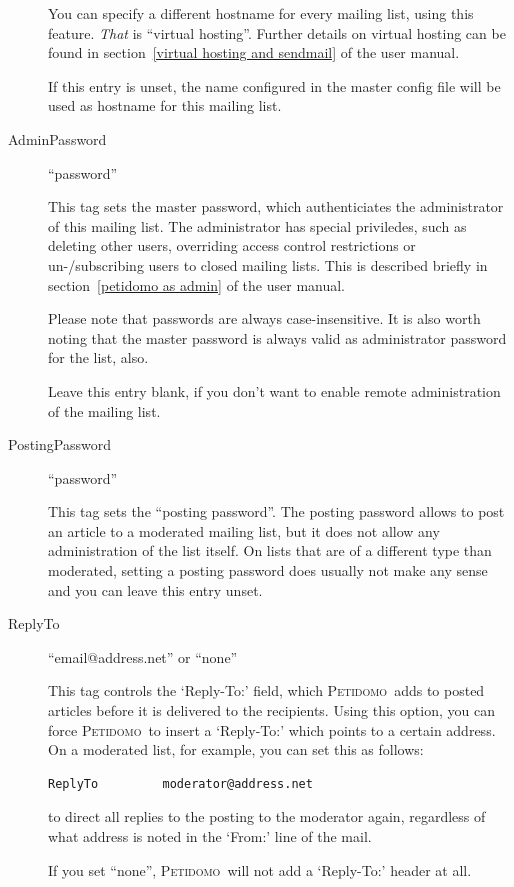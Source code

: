 \documentclass[a4paper,10pt]{scrreprt}
\newcommand{\Petidomo}{{\scshape Peti\-domo}}
\begin{document}
\begin{description}
You can specify a different hostname for every mailing list, using
this feature. \emph{That} is ``virtual hosting''. Further details on
virtual hosting can be found in section~\ref{virtual hosting and
sendmail} of the user manual.

If this entry is unset, the name configured in the master config file
will be used as hostname for this mailing list.

\item[AdminPassword] \hfill ``password''
\label{list admin password}

This tag sets the master password, which authenticiates the
administrator of this mailing list. The administrator has special
priviledes, such as deleting other users, overriding access control
restrictions or un-/subscribing users to closed mailing lists. This is
described briefly in section~\ref{petidomo as admin} of the user manual.

Please note that passwords are always case-insensitive. It is also
worth noting that the master password is always valid as administrator
password for the list, also.

Leave this entry blank, if you don't want to enable remote
administration of the mailing list.

\item[PostingPassword] \hfill ``password''
\label{posting password}

This tag sets the ``posting password''. The posting password allows to
post an article to a moderated mailing list, but it does not allow any
administration of the list itself. On lists that are of a different
type than moderated, setting a posting password does usually not make
any sense and you can leave this entry unset.

\item[ReplyTo] \hfill ``email@address.net'' or ``none''

This tag controls the `Reply-To:' field, which \Petidomo\ adds to
posted articles before it is delivered to the recipients. Using this
option, you can force \Petidomo\ to insert a `Reply-To:' which points
to a certain address. On a moderated list, for example, you can set
this as follows:
\begin{verbatim}
ReplyTo         moderator@address.net
\end{verbatim}
to direct all replies to the posting to the moderator again,
regardless of what address is noted in the `From:' line of the mail.

If you set ``none'', \Petidomo\ will not add a `Reply-To:' header at
all.


\end{description}
\end{document}
